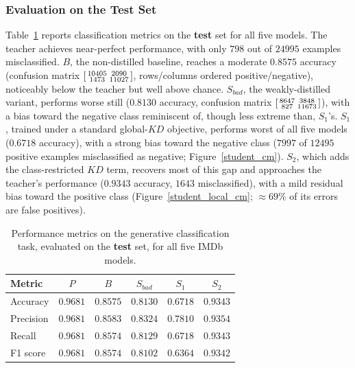 \documentclass[conference]{IEEEtran}
\begin{document}
\subsubsection{Evaluation on the \textbf{Test} Set}\label{sec:test-eval}

Table~\ref{tab:imdb_perf} reports classification metrics on the \textbf{test} set for all five models. The teacher achieves near-perfect performance, with only $798$ out of $24995$ examples misclassified. $B$, the non-distilled baseline, reaches a moderate $0.8575$ accuracy (confusion matrix $\begin{bsmallmatrix}10405 & 2090\\1473 & 11027\end{bsmallmatrix}$, rows/columns ordered positive/negative), noticeably below the teacher but well above chance. $S_{bad}$, the weakly-distilled variant, performs worse still ($0.8130$ accuracy, confusion matrix $\begin{bsmallmatrix}8647 & 3848\\827 & 11673\end{bsmallmatrix}$), with a bias toward the negative class reminiscent of, though less extreme than, $S_1$'s. $S_1$, trained under a standard global-$KD$ objective, performs worst of all five models ($0.6718$ accuracy), with a strong bias toward the negative class ($7997$ of $12495$ positive examples misclassified as negative; Figure~\ref{student_cm}). $S_2$, which adds the class-restricted $KD$ term, recovers most of this gap and approaches the teacher's performance ($0.9343$ accuracy, $1643$ misclassified), with a mild residual bias toward the positive class (Figure~\ref{student_local_cm}; $\approx69\%$ of its errors are false positives).

\begin{table}[h!]
\centering
\caption{Performance metrics on the generative classification task, evaluated on the \textbf{test} set, for all five IMDb models.}
    \begin{tabular}{|l|c|c|c|c|c|}
        \hline
        Metric & $P$ & $B$ & $S_{bad}$ & $S_1$ & $S_2$ \\ \hline
        Accuracy & $0.9681$ & $0.8575$ & $0.8130$ & $0.6718$ & $0.9343$ \\
        Precision & $0.9681$ & $0.8583$ & $0.8324$ & $0.7810$ & $0.9354$ \\
        Recall & $0.9681$ & $0.8574$ & $0.8129$ & $0.6718$ & $0.9343$ \\
        F1 score & $0.9681$ & $0.8574$ & $0.8102$ & $0.6364$ & $0.9342$ \\ \hline
    \end{tabular}
    \label{tab:imdb_perf}
\end{table}
\end{document}
